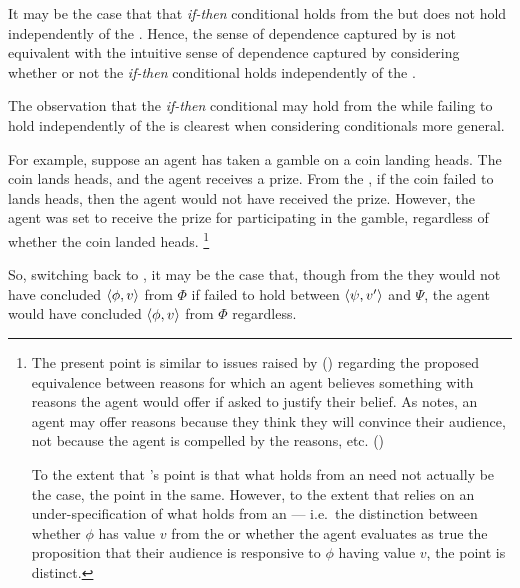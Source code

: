 \begin{note}
  It may be the case that that \emph{if-then} conditional holds from the \agpe{} but does not hold independently of the \agpe{}.
  Hence, the sense of dependence captured by \qWhyV{} is not equivalent with the intuitive sense of dependence captured by considering whether or not the \emph{if-then} conditional holds independently of the \agpe{}.

  The observation that the \emph{if-then} conditional may hold from the \agpe{} while failing to hold independently of the \agpe{} is clearest when considering conditionals more general.

  For example, suppose an agent has taken a gamble on a coin landing heads.
  The coin lands heads, and the agent receives a prize.
  From the \agpe{}, if the coin failed to lands heads, then the agent would not have received the prize.
  However, the agent was set to receive the prize for participating in the gamble, regardless of whether the coin landed heads.%
  \footnote{
    The present point is similar to issues raised by \citeauthor{Harman:1973ww} (\citeyear{Harman:1973ww}) regarding the proposed equivalence between reasons for which an agent believes something with reasons the agent would offer if asked to justify their belief.
  As \citeauthor{Harman:1973ww} notes, an agent may offer reasons because they think they will convince their audience, not because the agent is compelled by the reasons, etc.
  (\citeyear[Ch.2]{Harman:1973ww})

  To the extent that \citeauthor{Harman:1973ww}'s point is that what holds from an \agpe{} need not actually be the case, the point in the same.
  However, to the extent that \citeauthor{Harman:1973ww} relies on an under-specification of what holds from an \agpe{} --- i.e.\ the distinction between whether \(\phi\) has value \(v\) from the \agpe{} or whether the agent evaluates as true the proposition that their audience is responsive to \(\phi\) having value \(v\), the point is distinct.
  }

  So, switching back to \qWhyV{}, it may be the case that, though from the \agpe{} they would not have concluded \(\langle \phi, v \rangle\) from \(\Phi\) if \support{} failed to hold between \(\langle \psi, v' \rangle\) and \(\Psi\), the agent would have concluded \(\langle \phi, v \rangle\) from \(\Phi\) regardless.
\end{note}

